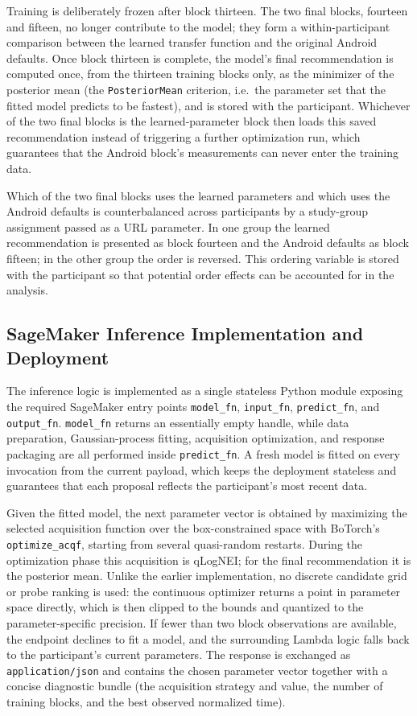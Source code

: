 \documentclass[12pt,a4paper]{report}
\begin{document}
        Training is deliberately frozen after block thirteen. The two final blocks, fourteen and fifteen, no longer contribute to the model; they form a within-participant comparison between the learned transfer function and the original Android defaults. Once block thirteen is complete, the model's final recommendation is computed once, from the thirteen training blocks only, as the minimizer of the posterior mean (the \texttt{PosteriorMean} criterion, i.e.\ the parameter set that the fitted model predicts to be fastest), and is stored with the participant. Whichever of the two final blocks is the learned-parameter block then loads this saved recommendation instead of triggering a further optimization run, which guarantees that the Android block's measurements can never enter the training data.

        Which of the two final blocks uses the learned parameters and which uses the Android defaults is counterbalanced across participants by a study-group assignment passed as a URL parameter. In one group the learned recommendation is presented as block fourteen and the Android defaults as block fifteen; in the other group the order is reversed. This ordering variable is stored with the participant so that potential order effects can be accounted for in the analysis.

        \subsection{SageMaker Inference Implementation and Deployment}

        The inference logic is implemented as a single stateless Python module exposing the required SageMaker entry points \texttt{model\_fn}, \texttt{input\_fn}, \texttt{predict\_fn}, and \texttt{output\_fn}. \texttt{model\_fn} returns an essentially empty handle, while data preparation, Gaussian-process fitting, acquisition optimization, and response packaging are all performed inside \texttt{predict\_fn}. A fresh model is fitted on every invocation from the current payload, which keeps the deployment stateless and guarantees that each proposal reflects the participant's most recent data.

        Given the fitted model, the next parameter vector is obtained by maximizing the selected acquisition function over the box-constrained space with BoTorch's \texttt{optimize\_acqf}, starting from several quasi-random restarts. During the optimization phase this acquisition is qLogNEI; for the final recommendation it is the posterior mean. Unlike the earlier implementation, no discrete candidate grid or probe ranking is used: the continuous optimizer returns a point in parameter space directly, which is then clipped to the bounds and quantized to the parameter-specific precision. If fewer than two block observations are available, the endpoint declines to fit a model, and the surrounding Lambda logic falls back to the participant's current parameters. The response is exchanged as \texttt{application/json} and contains the chosen parameter vector together with a concise diagnostic bundle (the acquisition strategy and value, the number of training blocks, and the best observed normalized time).
\end{document}
